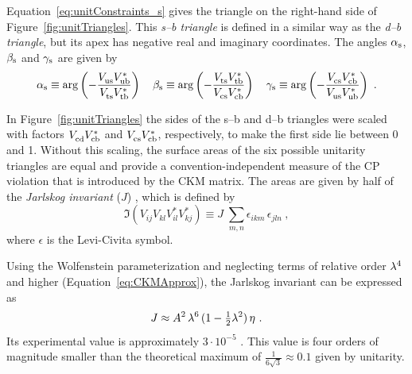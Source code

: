 Equation~\ref{eq:unitConstraints_s} gives the triangle on the right-hand side of Figure~\ref{fig:unitTriangles}. This \emph{s--b triangle}
is defined in a similar way as the \emph{d--b triangle}, but its apex has negative real and imaginary coordinates. The angles $\alpha_\text{s}$, $\beta_\text{s}$
and $\gamma_\text{s}$ are given by
\begin{equation}
  \as \equiv \arg\left( -\frac{\Vus\Vub[*]}{\Vts\Vtb[*]} \right)
  \quad
  \bs \equiv \arg\left( -\frac{\Vts\Vtb[*]}{\Vcs\Vcb[*]} \right)
  \quad
  \gs \equiv \arg\left( -\frac{\Vcs\Vcb[*]}{\Vus\Vub[*]} \right)
  \ .
\end{equation}

In Figure~\ref{fig:unitTriangles} the sides of the s--b and d--b triangles were scaled with factors $\Vcd\Vcb[*]$ and $\Vcs\Vcb[*]$,
respectively, to make the first side lie between 0 and 1. Without this scaling, the surface areas of the six possible unitarity triangles
are equal and provide a convention-independent measure of the CP violation that is introduced by the CKM matrix. The areas are given by
half of the \emph{Jarlskog invariant} ($J$) \cite{Jarlskog:1985ht}, which is defined by
\begin{equation}
  \Im(V_{ij}V_{kl}V_{il}^*V_{kj}^*) \equiv J\; \sum_{m,n} \epsilon_{ikm}\,\epsilon_{jln}
  \ ,
\end{equation}
where $\epsilon$ is the Levi-Civita symbol.

Using the Wolfenstein parameterization and neglecting terms of relative order $\lambda^4$ and higher (Equation~\ref{eq:CKMApprox}), the
Jarlskog invariant can be expressed as
\begin{equation}
  J \approx A^2\, \lambda^6\, (1-\tfrac{1}{2}\lambda^2)\, \eta
  \ .
\end{equation}
Its experimental value is approximately $3\cdot10^{-5}$ \cite{Charles:2004jd,Bona:2005vz}. This value is four orders of magnitude smaller
than the theoretical maximum of $\frac{1}{6\sqrt{3}}\approx0.1$ given by unitarity.

